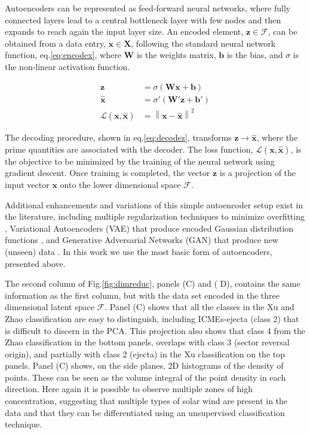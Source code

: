 Autoencoders can be represented as feed-forward neural networks, where fully connected layers lead to a central bottleneck layer with few nodes and then expands to reach again the input layer size. An encoded element, $\boldsymbol{z} \in \boldsymbol{\mathcal{F}}$, can be obtained from a data entry, $\boldsymbol{x} \in \boldsymbol{X}$, following the standard neural network function, eq.\eqref{eq:encodex}, where $\boldsymbol{W}$ is the weights matrix, $\boldsymbol{b}$ is the bias, and $\sigma$ is the non-linear activation function.

\begin{align}
\boldsymbol{z} & = \sigma \left( \boldsymbol{W}\boldsymbol{x} + \boldsymbol{b} \right) \label{eq:encodex} \\
\boldsymbol{\hat{x}} & = \sigma' \left( \boldsymbol{W'}\boldsymbol{z} + \boldsymbol{b'} \right) \label{eq:decodez} \\ 
\mathcal{L}(\boldsymbol{x}, \boldsymbol{\hat{x}}) & =  \left\lVert \boldsymbol{x}- \boldsymbol{\hat{x}} \right\rVert^2 \label{eq:aeloss}
\end{align}

The decoding procedure, shown in eq.\eqref{eq:decodez}, transforms $\boldsymbol{z}\rightarrow\boldsymbol{\hat{x}}$, where the prime quantities are associated with the decoder. The loss function, $\mathcal{L}(\boldsymbol{x}, \boldsymbol{\hat{x}})$, is the objective to be minimized by the training of the neural network using gradient descent. Once training is completed, the vector $\boldsymbol{z}$ is a projection of the input vector $\boldsymbol{x}$ onto the lower dimensional space $\boldsymbol{\mathcal{F}}$.

Additional enhancements and variations of this simple autoencoder setup exist in the literature, including multiple regularization techniques to minimize overfitting \citep{7407967}, Variational Autoencoders (VAE) that produce encoded Gaussian distribution functions \citep{Kingma2013}, and Generative Adversarial Networks (GAN) that produce new (unseen) data \citep{Goodfellow2014}. In this work we use the most basic form of autoencoders, presented above.

The second column of Fig.\ref{fig:dimreduc}, panels (C) and (
D), contains the same information as the first column, but with the data set encoded in the three dimensional latent space $\boldsymbol{\mathcal{F}}$. Panel (C) shows that all the classes in the Xu and Zhao classification are easy to distinguish, including ICMEs-ejecta (class 2) that is difficult to discern in the PCA. This projection also shows that class 4 from the Zhao classification in the bottom panels, overlaps with class 3 (sector reversal origin), and partially with class 2 (ejecta) in the Xu classification on the top panels. Panel (C) shows, on the side planes, 2D histograms of the density of points. These can be seen as the volume integral of the point density in each direction. Here again it is possible to observe multiple zones of high concentration, suggesting that multiple types of solar wind are present in the data and that they can be differentiated using an unsupervised classification technique. 

